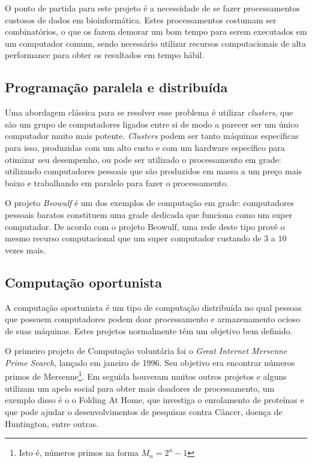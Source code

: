 
O ponto de partida para este projeto é a necessidade de se fazer processamentos custosos de 
dados em bioinformática. Estes processamentos costumam ser combinatórios, o que os fazem
demorar um bom tempo para serem executados em um computador comum, sendo necessário utilizar recursos
computacionais de alta performance para obter os resultados em tempo hábil.

\subsection{Programação paralela e distribuída}

Uma abordagem clássica para se resolver esse problema é utilizar \textit{clusters}, que são um grupo de computadores
ligados entre si de modo a parecer ser um único computador muito mais potente. \textit{Clusters} podem ser tanto máquinas
específicas para isso, produzidas com um alto custo e com um hardware específico para otimizar seu desempenho, ou 
pode ser utilizado o processamento em grade: utilizando computadores pessoais que são produzidos em massa a um preço mais baixo e 
trabalhando em paralelo para fazer o processamento. 

O projeto \emph{Beowulf} é um dos exemplos de computação em grade: computadores pessoais baratos constituem uma grade dedicada 
que funciona como um super computador. De acordo com o projeto Beowulf, uma rede deste tipo provê o mesmo recurso computacional 
que um super computador custando de $3$ a $10$ vezes mais. 



\subsection{Computação oportunista}


A computação oportunista é um tipo de computação distribuída no qual pessoas que possuem computadores podem doar processamento e
armazenamento ocioso de suas máquinas. Estes projetos normalmente têm um objetivo bem definido.

O primeiro projeto de Computação voluntária foi o \textit{Great Internet Mersenne Prime Search}, lançado em janeiro de 1996. 
Seu objetivo era encontrar números primos de Mersenne\footnote{Isto é, números primos na forma $M_n = 2^n - 1$}. Em seguida houveram 
muitos outros projetos e alguns utilizam um apelo social para obter mais doadores de processamento, um exemplo disso é o
o Folding At Home, que investiga o enrolamento de proteínas e que pode ajudar o desenvolvimentos de pesquisas contra 
Câncer, doença de Huntington, entre outras. 

